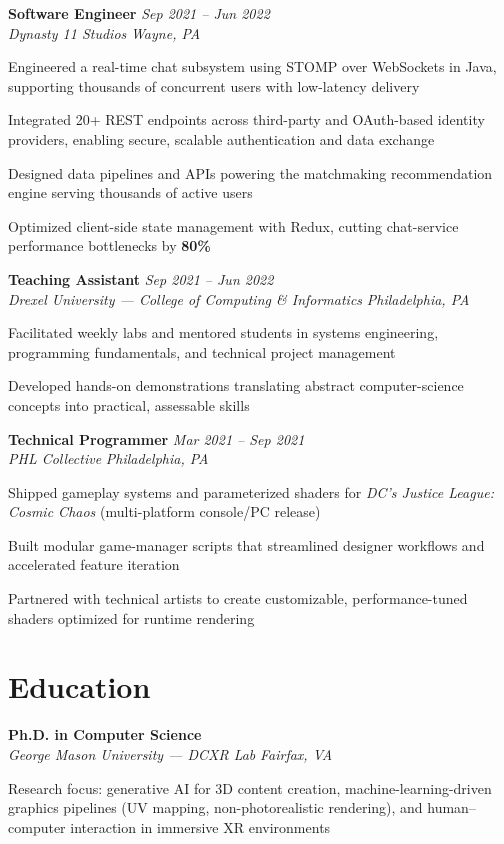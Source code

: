 \documentclass[letterpaper,10pt]{article}
\newcommand{\role}[4]{%
  \textbf{#1} \hfill \textit{#3}\\[-1pt]
  \textit{#2} \hfill \textit{#4}\par\vspace{2pt}
}
\newcommand{\education}[4]{%
  \textbf{#1} \hfill \textit{#3}\\[-1pt]
  \textit{#2} \hfill \textit{#4}\par\vspace{2pt}
}
\begin{document}
\role{Software Engineer}{Dynasty 11 Studios}{Sep 2021 -- Jun 2022}{Wayne, PA}
\begin{tightitemize}
  \item Engineered a real-time chat subsystem using STOMP over WebSockets in Java, supporting thousands of concurrent users with low-latency delivery
  \item Integrated 20+ REST endpoints across third-party and OAuth-based identity providers, enabling secure, scalable authentication and data exchange
  \item Designed data pipelines and APIs powering the matchmaking recommendation engine serving thousands of active users
  \item Optimized client-side state management with Redux, cutting chat-service performance bottlenecks by \textbf{80\%}
\end{tightitemize}

\role{Teaching Assistant}{Drexel University --- College of Computing \& Informatics}{Sep 2021 -- Jun 2022}{Philadelphia, PA}
\begin{tightitemize}
  \item Facilitated weekly labs and mentored students in systems engineering, programming fundamentals, and technical project management
  \item Developed hands-on demonstrations translating abstract computer-science concepts into practical, assessable skills
\end{tightitemize}

\role{Technical Programmer}{PHL Collective}{Mar 2021 -- Sep 2021}{Philadelphia, PA}
\begin{tightitemize}
  \item Shipped gameplay systems and parameterized shaders for \textit{DC's Justice League: Cosmic Chaos} (multi-platform console/PC release)
  \item Built modular game-manager scripts that streamlined designer workflows and accelerated feature iteration
  \item Partnered with technical artists to create customizable, performance-tuned shaders optimized for runtime rendering
\end{tightitemize}

\section*{Education}
\education{Ph.D. in Computer Science}{George Mason University --- DCXR Lab}{}{Fairfax, VA}
\begin{tightitemize}
  \item Research focus: generative AI for 3D content creation, machine-learning-driven graphics pipelines (UV mapping, non-photorealistic rendering), and human--computer interaction in immersive XR environments
\end{tightitemize}
\end{document}
